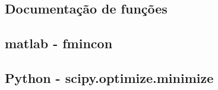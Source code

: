 \begin{anexosenv}

\partanexos

\chapter{Documentação de funções}
\label{ch:documentacao_de_funcoes}

\section{\acrshort{matlab} - fmincon}
\label{sec:fmincon}



\section{Python - scipy.optimize.minimize}
\label{sec:scipy_optimize_minimize}




\end{anexosenv}